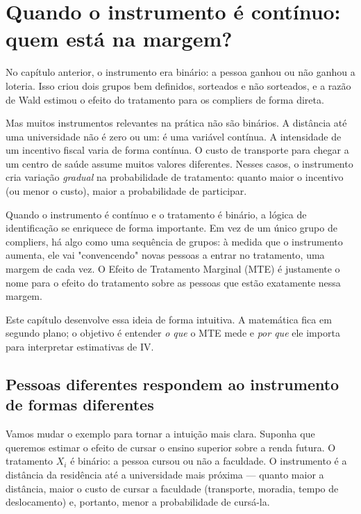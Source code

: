 
\chapter{Quando o instrumento é contínuo: quem está na margem?}
\label{cap:mte}

No capítulo anterior, o instrumento era binário: a pessoa ganhou ou não ganhou a loteria. Isso criou dois grupos bem definidos, sorteados e não sorteados, e a razão de Wald estimou o efeito do tratamento para os compliers de forma direta.

Mas muitos instrumentos relevantes na prática não são binários. A distância até uma universidade não é zero ou um: é uma variável contínua. A intensidade de um incentivo fiscal varia de forma contínua. O custo de transporte para chegar a um centro de saúde assume muitos valores diferentes. Nesses casos, o instrumento cria variação \textit{gradual} na probabilidade de tratamento: quanto maior o incentivo (ou menor o custo), maior a probabilidade de participar.

Quando o instrumento é contínuo e o tratamento é binário, a lógica de identificação se enriquece de forma importante. Em vez de um único grupo de compliers, há algo como uma sequência de grupos: à medida que o instrumento aumenta, ele vai "convencendo" novas pessoas a entrar no tratamento, uma margem de cada vez. O Efeito de Tratamento Marginal (MTE) é justamente o nome para o efeito do tratamento sobre as pessoas que estão exatamente nessa margem.

Este capítulo desenvolve essa ideia de forma intuitiva. A matemática fica em segundo plano; o objetivo é entender \textit{o que} o MTE mede e \textit{por que} ele importa para interpretar estimativas de IV.

\section{Pessoas diferentes respondem ao instrumento de formas diferentes}
\label{sec:heterogeneidade_selecao}

Vamos mudar o exemplo para tornar a intuição mais clara. Suponha que queremos estimar o efeito de cursar o ensino superior sobre a renda futura. O tratamento $X_i$ é binário: a pessoa cursou ou não a faculdade. O instrumento é a distância da residência até a universidade mais próxima --- quanto maior a distância, maior o custo de cursar a faculdade (transporte, moradia, tempo de deslocamento) e, portanto, menor a probabilidade de cursá-la.

